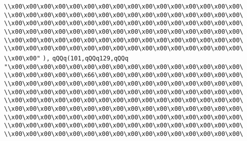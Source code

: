 \verb|\\x00\x00\x00\x00\x00\x00\x00\x00\x00\x00\x00\x00\x00\x00\x00\x00\|\newline
\verb|\\x00\x00\x00\x00\x00\x00\x00\x00\x00\x00\x00\x00\x00\x00\x00\x00\|\newline
\verb|\\x00\x00\x00\x00\x00\x00\x00\x00\x00\x00\x00\x00\x00\x00\x00\x00\|\newline
\verb|\\x00\x00\x00\x00\x00\x00\x00\x00\x00\x00\x00\x00\x00\x00\x00\x00\|\newline
\verb|\\x00\x00\x00\x00\x00\x00\x00\x00\x00\x00\x00\x00\x00\x00\x00\x00\|\newline
\verb|\\x00\x00\x00\x00\x00\x00\x00\x00\x00\x00\x00\x00\x00\x00\x00\x00\|\newline
\verb|\\x00\x00"|\newline
\verb|),|\newline
\verb|qQQq(101,qQQq129,qQQq|\newline
\verb|"\x00\x00\x00\x00\x00\x00\x00\x00\x00\x00\x00\x00\x00\x00\x00\x00\|\newline
\verb|\\x00\x00\x00\x00\x00\x66\x00\x00\x00\x00\x00\x00\x00\x00\x00\x00\|\newline
\verb|\\x00\x00\x00\x00\x00\x00\x00\x00\x00\x00\x00\x00\x00\x00\x00\x00\|\newline
\verb|\\x00\x00\x00\x00\x00\x00\x00\x00\x00\x00\x00\x00\x00\x00\x00\x00\|\newline
\verb|\\x00\x00\x00\x00\x00\x00\x00\x00\x00\x00\x00\x00\x00\x00\x00\x00\|\newline
\verb|\\x00\x00\x00\x00\x00\x00\x00\x00\x00\x00\x00\x00\x00\x00\x00\x00\|\newline
\verb|\\x00\x00\x00\x00\x00\x00\x00\x00\x00\x00\x00\x00\x00\x00\x00\x00\|\newline
\verb|\\x00\x00\x00\x00\x00\x00\x00\x00\x00\x00\x00\x00\x00\x00\x00\x00\|\newline
\verb|\\x00\x00\x00\x00\x00\x00\x00\x00\x00\x00\x00\x00\x00\x00\x00\x00\|\newline
